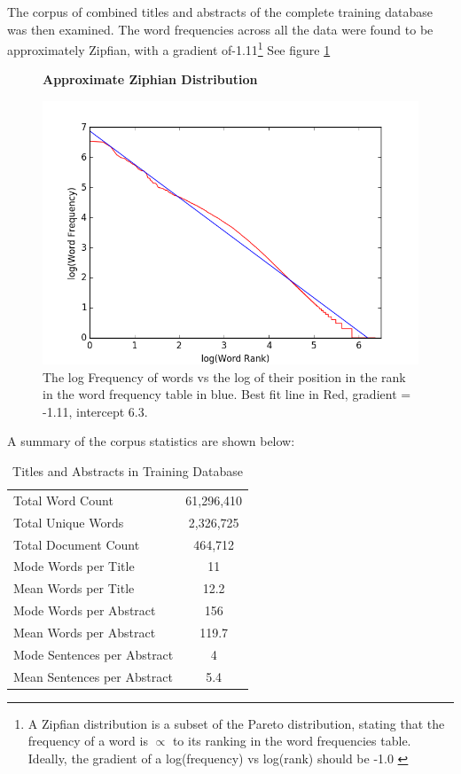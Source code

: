 The corpus of combined titles and abstracts of the complete training database was then examined. The word frequencies across all the data were found to be approximately Zipfian, with a gradient of-1.11\footnote{A Zipfian distribution is a subset of the Pareto distribution, stating that the frequency of a word is $\propto$ to its ranking in the word frequencies table. Ideally, the gradient of a log(frequency) vs log(rank) should be -1.0 \cite{zipf}} See figure \ref{fig:ZIPF}
\begin{figure}[H]
    \centering
    \textbf{Approximate Ziphian Distribution}\par\medskip
    \includegraphics[scale=0.6]{Data_Acquisition/zipf.png}
    \caption{The log Frequency of words vs the log of their position in the rank in the word frequency table in blue. Best fit line in Red, gradient = -1.11, intercept 6.3. }
     \label{fig:ZIPF}
\end{figure}
A summary of the corpus statistics are shown below:
\begin{table}[h!]
\label{tab:CORPUS STATS}
\caption{Titles and Abstracts in Training Database}
\begin{center}
\begin{tabular}{||l|c||}
\hline
Total Word Count & 61,296,410\\
Total Unique Words & 2,326,725\\
Total Document Count & 464,712\\
Mode Words per Title &  11\\
Mean Words per Title &  12.2\\
Mode Words per Abstract & 156\\
Mean Words per Abstract & 119.7\\
Mode Sentences per Abstract & 4\\
Mean Sentences per Abstract & 5.4\\
\hline
\end{tabular}
\end{center}
\end{table}

\label{sec:SCRAPEANALYSIS}
